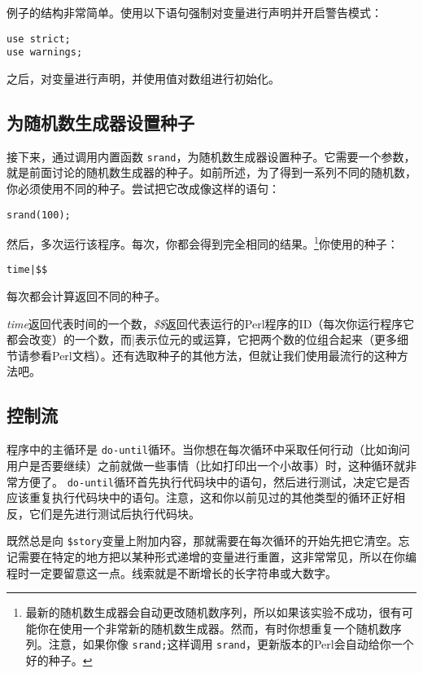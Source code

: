 例子的结构非常简单。使用以下语句强制对变量进行声明并开启警告模式：

\begin{lstlisting}
use strict;
use warnings;
\end{lstlisting}

之后，对变量进行声明，并使用值对数组进行初始化。

\subsection{为随机数生成器设置种子} 
接下来，通过调用内置函数 \verb|srand|，为随机数生成器设置种子。它需要一个参数，就是前面讨论的随机数生成器的种子。如前所述，为了得到一系列不同的随机数，你必须使用不同的种子。尝试把它改成像这样的语句：

\begin{lstlisting}
srand(100);
\end{lstlisting}

然后，多次运行该程序。每次，你都会得到完全相同的结果。\footnote{最新的随机数生成器会自动更改随机数序列，所以如果该实验不成功，很有可能你在使用一个非常新的随机数生成器。然而，有时你想重复一个随机数序列。注意，如果你像 \verb|srand;|这样调用 \verb|srand|，更新版本的Perl会自动给你一个好的种子。}你使用的种子：

\begin{lstlisting}
time|$$ 
\end{lstlisting}

每次都会计算返回不同的种子。

\textit{time}返回代表时间的一个数，\textit{\$\$}返回代表运行的Perl程序的ID（每次你运行程序它都会改变）的一个数，而|表示位元的或运算，它把两个数的位组合起来（更多细节请参看Perl文档）。还有选取种子的其他方法，但就让我们使用最流行的这种方法吧。

\subsection{控制流}
程序中的主循环是 \verb|do-until|循环。当你想在每次循环中采取任何行动（比如询问用户是否要继续）之前就做一些事情（比如打印出一个小故事）时，这种循环就非常方便了。 \verb|do-until|循环首先执行代码块中的语句，然后进行测试，决定它是否应该重复执行代码块中的语句。注意，这和你以前见过的其他类型的循环正好相反，它们是先进行测试后执行代码块。

既然总是向 \verb|$story|变量上附加内容，那就需要在每次循环的开始先把它清空。忘记需要在特定的地方把以某种形式递增的变量进行重置，这非常常见，所以在你编程时一定要留意这一点。线索就是不断增长的长字符串或大数字。

